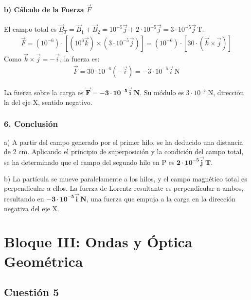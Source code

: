 \paragraph*{b) Cálculo de la Fuerza $\vec{F}$}
El campo total es $\vec{B}_T = \vec{B}_1 + \vec{B}_2 = 10^{-5}\vec{j} + 2\cdot10^{-5}\vec{j} = 3\cdot10^{-5}\vec{j}\,\text{T}$.
\begin{gather}
    \vec{F} = (10^{-6}) \cdot [ (10^6 \vec{k}) \times (3\cdot10^{-5}\vec{j}) ] = (10^{-6}) \cdot [ 30 \cdot (\vec{k}\times\vec{j}) ]
\end{gather}
Como $\vec{k}\times\vec{j} = -\vec{i}$, la fuerza es:
\begin{gather}
    \vec{F} = 30 \cdot 10^{-6} (-\vec{i}) = -3\cdot10^{-5}\vec{i}\,\text{N}
\end{gather}
\begin{cajaresultado}
    La fuerza sobre la carga es $\boldsymbol{\vec{F} = -3\cdot10^{-5}\vec{i}\,\textbf{N}}$. Su módulo es $3\cdot10^{-5}\,\text{N}$, dirección la del eje X, sentido negativo.
\end{cajaresultado}

\subsubsection*{6. Conclusión}
\begin{cajaconclusion}
a) A partir del campo generado por el primer hilo, se ha deducido una distancia de 2 cm. Aplicando el principio de superposición y la condición del campo total, se ha determinado que el campo del segundo hilo en P es $\mathbf{2\cdot10^{-5}\vec{j}\,T}$.

b) La partícula se mueve paralelamente a los hilos, y el campo magnético total es perpendicular a ellos. La fuerza de Lorentz resultante es perpendicular a ambos, resultando en $\mathbf{-3\cdot10^{-5}\vec{i}\,N}$, una fuerza que empuja a la carga en la dirección negativa del eje X.
\end{cajaconclusion}

\newpage

\section{Bloque III: Ondas y Óptica Geométrica}
\label{sec:ondopt_2020_sep_ext}

\subsection{Cuestión 5}
\label{subsec:C5_2020_sep_ext}

